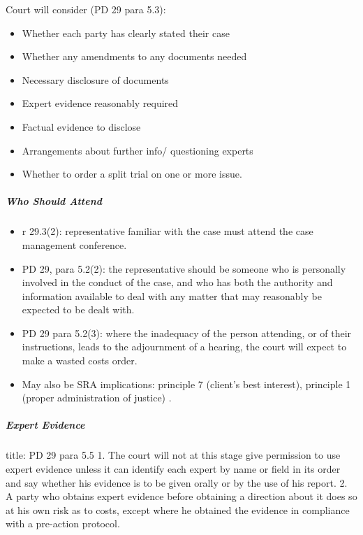 \documentclass[
]{article}
\newenvironment{Shaded}{}{}
\newcommand{\NormalTok}[1]{#1}
\providecommand{\tightlist}{%
  \setlength{\itemsep}{0pt}\setlength{\parskip}{0pt}}
\begin{document}
Court will consider (PD 29 para 5.3):

\begin{itemize}
\tightlist
\item
  Whether each party has clearly stated their case
\item
  Whether any amendments to any documents needed
\item
  Necessary disclosure of documents
\item
  Expert evidence reasonably required
\item
  Factual evidence to disclose
\item
  Arrangements about further info/ questioning experts
\item
  Whether to order a split trial on one or more issue.
\end{itemize}

\hypertarget{who-should-attend}{%
\subparagraph{Who Should Attend}\label{who-should-attend}}

\begin{itemize}
\tightlist
\item
  r 29.3(2): representative familiar with the case must attend the case
  management conference.
\item
  PD 29, para 5.2(2): the representative should be someone who is
  personally involved in the conduct of the case, and who has both the
  authority and information available to deal with any matter that may
  reasonably be expected to be dealt with.
\item
  PD 29 para 5.2(3): where the inadequacy of the person attending, or of
  their instructions, leads to the adjournment of a hearing, the court
  will expect to make a wasted costs order.
\item
  May also be SRA implications: principle 7 (client's best interest),
  principle 1 (proper administration of justice) .
\end{itemize}

\hypertarget{expert-evidence}{%
\subparagraph{Expert Evidence}\label{expert-evidence}}

\begin{Shaded}
\begin{Highlighting}[]
\NormalTok{title: PD 29 para 5.5}
\NormalTok{1. The court will not at this stage give permission to use expert evidence unless it can identify each expert by name or field in its order and say whether his evidence is to be given orally or by the use of his report.}
\NormalTok{2. A party who obtains expert evidence before obtaining a direction about it does so at his own risk as to costs, except where he obtained the evidence in compliance with a pre{-}action protocol.}
\end{Highlighting}
\end{Shaded}
\end{document}
